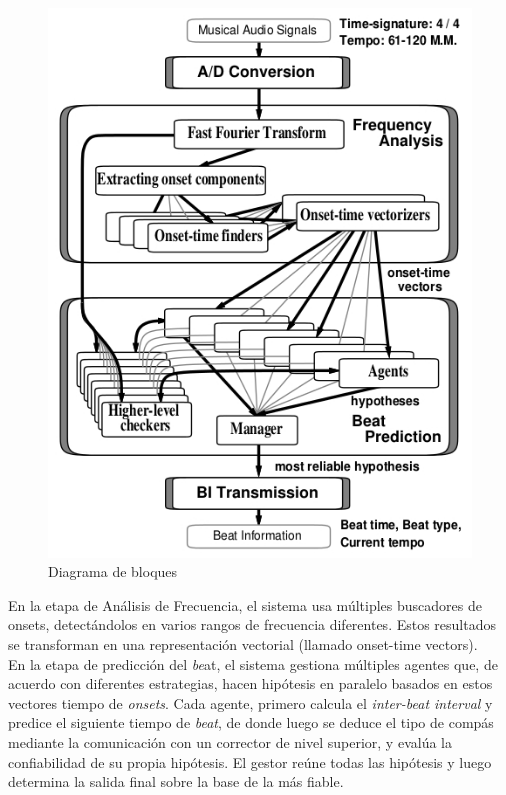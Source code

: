 \documentclass[12pt,a4paper,titlepage]{report}
\begin{document}
\begin{figure}
	\vspace{-20pt}
	\begin{center}
	\includegraphics[width=.5\textwidth]{./pics/agents_blocks.jpg}
	\end{center}
	\vspace{-10pt}
	\caption{Diagrama de bloques}
	\label{fig:agents_blocks}
\end{figure}

En la etapa de Análisis de Frecuencia, el sistema usa múltiples buscadores de onsets, detectándolos en varios rangos de frecuencia diferentes. Estos resultados se transforman en una representación vectorial (llamado onset-time vectors).\\

En la etapa de predicción del \emph{be}at, el sistema gestiona múltiples agentes que, de acuerdo con diferentes estrategias, hacen hipótesis en paralelo basados en estos vectores tiempo de \emph{onsets}. Cada agente, primero calcula el \emph{inter-beat interval} y predice el siguiente  tiempo de \emph{beat}, de donde luego se deduce el tipo de compás mediante la comunicación con un corrector de nivel superior, y evalúa la confiabilidad de su propia hipótesis. El gestor reúne todas las hipótesis y luego determina la salida final sobre la base de la más fiable.
\end{document}
